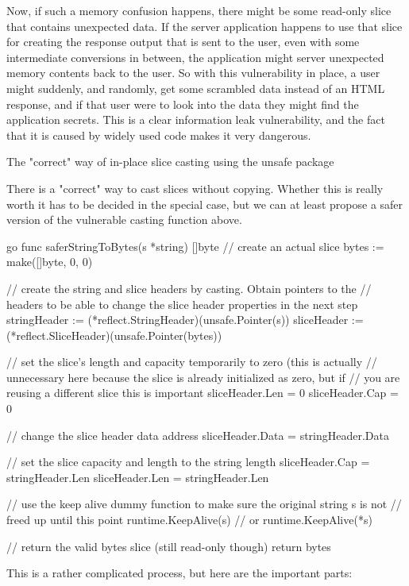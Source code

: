 Now, if such a memory confusion happens, there might be some read-only slice that contains unexpected data. If the
server application happens to use that slice for creating the response output that is sent to the user, even with some
intermediate conversions in between, the application might server unexpected memory contents back to the user. So with
this vulnerability in place, a user might suddenly, and randomly, get some scrambled data instead of an HTML response,
and if that user were to look into the data they might find the application secrets. This is a clear information leak
vulnerability, and the fact that it is caused by widely used code makes it very dangerous.


 The "correct" way of in-place slice casting using the unsafe package

There is a "correct" way to cast slices without copying. Whether this is really worth it has to be decided in the
special case, but we can at least propose a safer version of the vulnerable casting function above.

go
func saferStringToBytes(s *string) []byte 
    // create an actual slice
    bytes := make([]byte, 0, 0)

    // create the string and slice headers by casting. Obtain pointers to the
    // headers to be able to change the slice header properties in the next step
    stringHeader := (*reflect.StringHeader)(unsafe.Pointer(s))
    sliceHeader := (*reflect.SliceHeader)(unsafe.Pointer(bytes))

    // set the slice's length and capacity temporarily to zero (this is actually
    // unnecessary here because the slice is already initialized as zero, but if
    // you are reusing a different slice this is important
    sliceHeader.Len = 0
    sliceHeader.Cap = 0

    // change the slice header data address
    sliceHeader.Data = stringHeader.Data

    // set the slice capacity and length to the string length
    sliceHeader.Cap = stringHeader.Len
    sliceHeader.Len = stringHeader.Len

    // use the keep alive dummy function to make sure the original string s is not
    // freed up until this point
    runtime.KeepAlive(s)  // or runtime.KeepAlive(*s)

    // return the valid bytes slice (still read-only though)
    return bytes



This is a rather complicated process, but here are the important parts:

